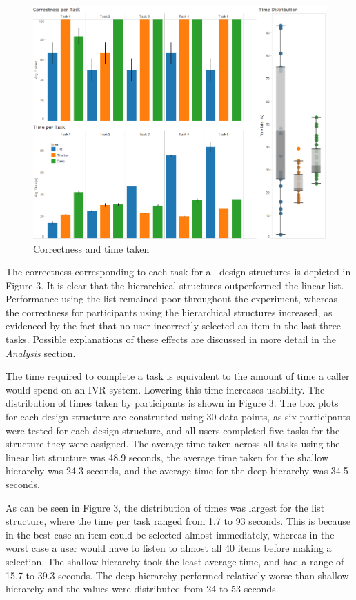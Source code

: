 \documentclass{sigchi}
\begin{document}
\begin{figure}[!h]
    \centering
    \includegraphics[width=0.9\columnwidth]{fig_CorrectnessAndTime}
    \caption{Correctness and time taken}
    \label{fig: Figure3}
\end{figure}

The correctness corresponding to each task for all design structures is depicted in Figure 3. It is clear that the hierarchical structures outperformed the linear list. Performance using the list remained poor throughout the experiment, whereas the correctness for participants using the hierarchical structures increased, as evidenced by the fact that no user incorrectly selected an item in the last three tasks. Possible explanations of these effects are discussed in more detail in the \textit{Analysis} section.

The time required to complete a task is equivalent to the amount of time a caller would spend on an IVR system. Lowering this time increases usability. The distribution of times taken by participants is shown in Figure 3. The box plots for each design structure are constructed using 30 data points, as six participants were tested for each design structure, and all users completed five tasks for the structure they were assigned. The average time taken across all tasks using the linear list structure was 48.9 seconds, the average time taken for the shallow hierarchy was 24.3 seconds, and the average time for the deep hierarchy was 34.5 seconds.

As can be seen in Figure 3, the distribution of times was largest for the list structure, where the time per task ranged from 1.7 to 93 seconds. This is because in the best case an item could be selected almost immediately, whereas in the worst case a user would have to listen to almost all 40 items before making a selection. The shallow hierarchy took the least average time, and had a range of 15.7 to 39.3 seconds. The deep hierarchy performed relatively worse than shallow hierarchy and the values were distributed from 24 to 53 seconds. 
\end{document}
